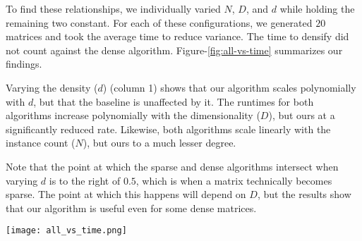 \documentclass[journal]{journal}
\begin{document}
To find these relationships, we individually varied $N$, $D$, and $d$ while holding the remaining two constant.
For each of these configurations, we generated $20$ matrices and took the average time to reduce variance.
The time to densify did not count against the dense algorithm.
Figure-\ref{fig:all-vs-time} summarizes our findings.

Varying the density ($d$) (column 1) shows that our algorithm scales polynomially with $d$, but that the baseline is unaffected by it.
The runtimes for both algorithms increase polynomially with the dimensionality ($D$), but ours at a significantly reduced rate.
Likewise, both algorithms scale linearly with the instance count ($N$), but ours to a much lesser degree.

Note that the point at which the sparse and dense algorithms intersect when varying $d$ is to the right of $0.5$, which is when a matrix technically becomes sparse.
The point at which this happens will depend on $D$, but the results show that our algorithm is useful even for some dense matrices.

\begin{figure*}[ht!]
\vskip 0.2in
\begin{center}
\centerline{\texttt{[image: all\_vs\_time.png]}}
\caption{
Summary performance comparison plots for quadratic (top) and cubic (bottom) cases showing how the algorithm's performance varies with $d$, $D$, and $N$; our sparse algorithm is shown in blue, the dense algorithm in red. Each point in each graph is an average of 20 runs, and the time used in densification is not included in the dense-algorithm timings. In the quadratic case, sparsity loses its advantage at about 67\%, and at about 77\% for the cubic case, though these precise intersections depend on $D$. In general, taking advantage of sparsity shows large benefits, so large that it's difficult to see that the performance does not actually change linearly with $D$ (column 2); figure \ref{fig:sparse_D_and_N_vs_time} gives further details.}
\label{fig:all-vs-time}
\end{center}
\vskip -0.2in
\end{figure*}
\end{document}
